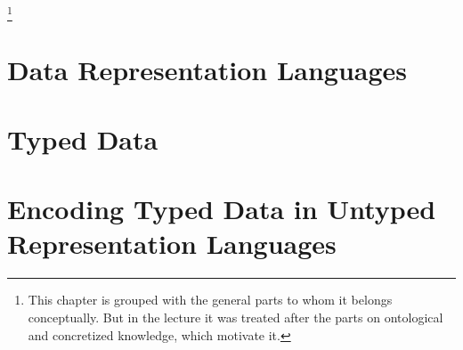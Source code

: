 \footnote{This chapter is grouped with the general parts to whom it belongs conceptually. But in the lecture it was treated after the parts on ontological and concretized knowledge, which motivate it.}

\section{Data Representation Languages}

\section{Typed Data}

\section{Encoding Typed Data in Untyped Representation Languages}